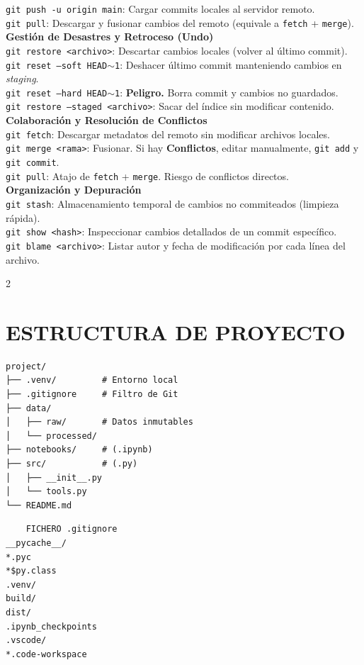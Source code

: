 \texttt{git push -u origin main}: Cargar commits locales al servidor remoto.\\
\texttt{git pull}: Descargar y fusionar cambios del remoto (equivale a \texttt{fetch} + \texttt{merge}).\\ 
\textbf{Gestión de Desastres y Retroceso (Undo)}\\
\texttt{git restore <archivo>}: Descartar cambios locales (volver al último commit).\\
\texttt{git reset --soft HEAD$\sim$1}: Deshacer último commit manteniendo cambios en \textit{staging}.\\
\texttt{git reset --hard HEAD$\sim$1}: \textbf{Peligro.} Borra commit y cambios no guardados.\\
\texttt{git restore --staged <archivo>}: Sacar del índice sin modificar contenido.\\
\textbf{Colaboración y Resolución de Conflictos}\\
\texttt{git fetch}: Descargar metadatos del remoto sin modificar archivos locales.\\
\texttt{git merge <rama>}: Fusionar. Si hay \textbf{Conflictos}, editar manualmente, \texttt{git add} y \texttt{git commit}.\\
\texttt{git pull}: Atajo de \texttt{fetch} + \texttt{merge}. Riesgo de conflictos directos.\\
\textbf{Organización y Depuración}\\
\texttt{git stash}: Almacenamiento temporal de cambios no commiteados (limpieza rápida).\\
\texttt{git show <hash>}: Inspeccionar cambios detallados de un commit específico.\\
\texttt{git blame <archivo>}: Listar autor y fecha de modificación por cada línea del archivo.


{
\setlength{\columnseprule}{0pt}
\begin{multicols}{2}
    \section*{ESTRUCTURA DE PROYECTO}
    \begin{Verbatim}
project/
├── .venv/         # Entorno local
├── .gitignore     # Filtro de Git
├── data/
│   ├── raw/       # Datos inmutables
│   └── processed/
├── notebooks/     # (.ipynb) 
├── src/           # (.py)
│   ├── __init__.py
│   └── tools.py
└── README.md
\end{Verbatim}
\columnbreak
\vspace*{-7pt}
    \begin{Verbatim}
    FICHERO .gitignore
__pycache__/
*.pyc
*$py.class
.venv/
build/
dist/
.ipynb_checkpoints
.vscode/
*.code-workspace
\end{Verbatim}
\end{multicols}
}


